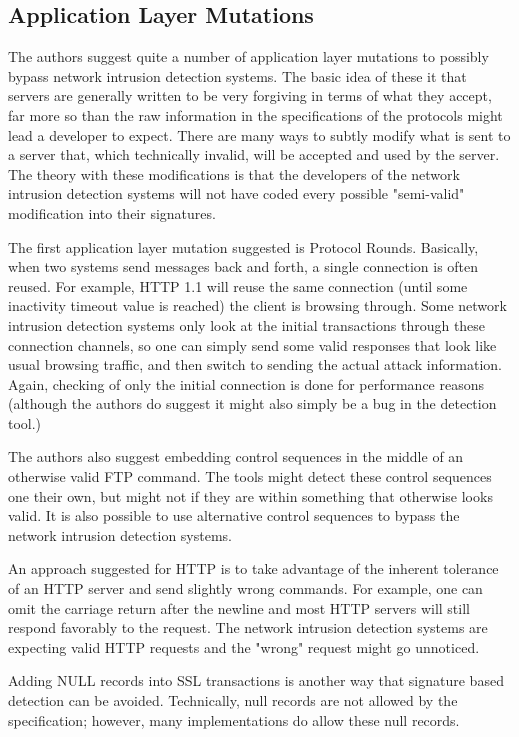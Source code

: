\documentclass{reading_glasses}
\begin{document}
\subsection{Application Layer Mutations}
The authors suggest quite a number of application layer mutations to possibly bypass network intrusion detection systems.  The basic idea of these it that servers are generally written to be very forgiving in terms of what they accept, far more so than the raw information in the specifications of the protocols might lead a developer to expect.  There are many ways to subtly modify what is sent to a server that, which technically invalid, will be accepted and used by the server.  The theory with these modifications is that the developers of the network intrusion detection systems will not have coded every possible "semi-valid" modification into their signatures.

The first application layer mutation suggested is Protocol Rounds.  Basically, when two systems send messages back and forth, a single connection is often reused.  For example, HTTP 1.1 will reuse the same connection (until some inactivity timeout value is reached) the client is browsing through.  Some network intrusion detection systems only look at the initial transactions through these connection channels, so one can simply send some valid responses that look like usual browsing traffic, and then switch to sending the actual attack information.  Again, checking of only the initial connection is done for performance reasons (although the authors do suggest it might also simply be a bug in the detection tool.)

The authors also suggest embedding control sequences in the middle of an otherwise valid FTP command.  The tools might detect these control sequences one their own, but might not if they are within something that otherwise looks valid.  It is also possible to use alternative control sequences to bypass the network intrusion detection systems.  

An approach suggested for HTTP is to take advantage of the inherent tolerance of an HTTP server and send slightly wrong commands.  For example, one can omit the carriage return after the newline and most HTTP servers will still respond favorably to the request.  The network intrusion detection systems are expecting valid HTTP requests and the "wrong" request might go unnoticed.  

Adding NULL records into SSL transactions is another way that signature based detection can be avoided.  Technically, null records are not allowed by the specification; however, many implementations do allow these null records.
\end{document}
